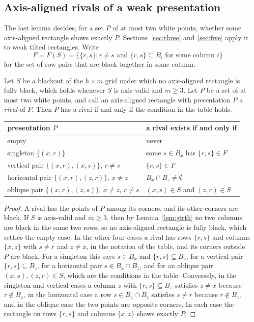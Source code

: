 \subsection{Axis-aligned rivals of a weak presentation}

The last lemma decides, for a set $P$ of at most two white points, whether some axis-aligned rectangle shows exactly $P$. Sections~\ref{sec:three} and~\ref{sec:five} apply it to weak tilted rectangles. Write
\[
F=F(S)=\bigl\{\{r,s\}:r\ne s\text{ and }\{r,s\}\subseteq B_i\text{ for some column }i\bigr\}
\]
for the set of row pairs that are black together in some column.

\begin{lemma}\label{lem:rival}
Let $S$ be a blackout of the $h\times m$ grid under which no axis-aligned rectangle is fully black, which holds whenever $S$ is axis-valid and $m\ge3$. Let $P$ be a set of at most two white points, and call an axis-aligned rectangle with presentation $P$ a \emph{rival} of $P$. Then $P$ has a rival if and only if the condition in the table holds.
\begin{center}
\begin{tabular}{@{}ll@{}}
\toprule
presentation $P$ & a rival exists if and only if\\
\midrule
empty & never\\
singleton $\{(x,r)\}$ & some $s\in B_x$ has $\{r,s\}\in F$\\
vertical pair $\{(x,r),(x,s)\}$, $r\ne s$ & $\{r,s\}\in F$\\
horizontal pair $\{(x,r),(z,r)\}$, $x\ne z$ & $B_x\cap B_z\ne\emptyset$\\
oblique pair $\{(x,r),(z,s)\}$, $x\ne z$, $r\ne s$ & $(x,s)\in S$ and $(z,r)\in S$\\
\bottomrule
\end{tabular}
\end{center}
\end{lemma}

\begin{proof}
A rival has the points of $P$ among its corners, and its other corners are black. If $S$ is axis-valid and $m\ge3$, then by Lemma~\ref{lem:girth} no two columns are black in the same two rows, so no axis-aligned rectangle is fully black, which settles the empty case. In the other four cases a rival has rows $\{r,s\}$ and columns $\{x,z\}$ with $s\ne r$ and $z\ne x$, in the notation of the table, and its corners outside $P$ are black. For a singleton this says $s\in B_x$ and $\{r,s\}\subseteq B_z$, for a vertical pair $\{r,s\}\subseteq B_z$, for a horizontal pair $s\in B_x\cap B_z$, and for an oblique pair $(x,s),(z,r)\in S$, which are the conditions in the table. Conversely, in the singleton and vertical cases a column $z$ with $\{r,s\}\subseteq B_z$ satisfies $z\ne x$ because $r\notin B_x$, in the horizontal case a row $s\in B_x\cap B_z$ satisfies $s\ne r$ because $r\notin B_x$, and in the oblique case the two points are opposite corners. In each case the rectangle on rows $\{r,s\}$ and columns $\{x,z\}$ shows exactly $P$.
\end{proof}
